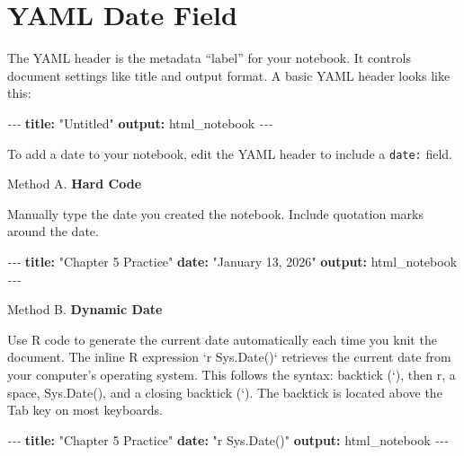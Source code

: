 \documentclass[
  12pt,
]{scrreprt}
\newenvironment{Shaded}{\begin{snugshade}}{\end{snugshade}}
\newcommand{\AttributeTok}[1]{\textcolor[rgb]{0.13,0.29,0.53}{#1}}
\newcommand{\FunctionTok}[1]{\textcolor[rgb]{0.13,0.29,0.53}{\textbf{#1}}}
\newcommand{\KeywordTok}[1]{\textcolor[rgb]{0.13,0.29,0.53}{\textbf{#1}}}
\newcommand{\PreprocessorTok}[1]{\textcolor[rgb]{0.56,0.35,0.01}{\textit{#1}}}
\newcommand{\StringTok}[1]{\textcolor[rgb]{0.31,0.60,0.02}{#1}}
\begin{document}
\section{YAML Date Field}\label{yaml-date-field}

The YAML header is the metadata ``label'' for your notebook. It controls
document settings like title and output format. A basic YAML header
looks like this:

\begin{Shaded}
\begin{Highlighting}[]
\PreprocessorTok{{-}{-}{-}}
\FunctionTok{title}\KeywordTok{:}\AttributeTok{ }\StringTok{"Untitled"}
\FunctionTok{output}\KeywordTok{:}\AttributeTok{ html\_notebook}
\PreprocessorTok{{-}{-}{-}}
\end{Highlighting}
\end{Shaded}

To add a date to your notebook, edit the YAML header to include a
\texttt{date:} field.

Method A. \textbf{Hard Code}

Manually type the date you created the notebook. Include quotation marks
around the date.

\begin{Shaded}
\begin{Highlighting}[]
\PreprocessorTok{{-}{-}{-}}
\FunctionTok{title}\KeywordTok{:}\AttributeTok{ }\StringTok{"Chapter 5 Practice"}
\FunctionTok{date}\KeywordTok{:}\AttributeTok{ }\StringTok{"January 13, 2026"}
\FunctionTok{output}\KeywordTok{:}\AttributeTok{ html\_notebook}
\PreprocessorTok{{-}{-}{-}}
\end{Highlighting}
\end{Shaded}

Method B. \textbf{Dynamic Date}

Use R code to generate the current date automatically each time you knit
the document. The inline R expression `r Sys.Date()` retrieves the
current date from your computer's operating system. This follows the
syntax: backtick (`), then r, a space, Sys.Date(), and a closing
backtick (`). The backtick is located above the Tab key on most
keyboards.

\begin{Shaded}
\begin{Highlighting}[]
\PreprocessorTok{{-}{-}{-}}
\FunctionTok{title}\KeywordTok{:}\AttributeTok{ }\StringTok{"Chapter 5 Practice"}
\FunctionTok{date}\KeywordTok{:}\AttributeTok{ }\StringTok{"\textasciigrave{}r Sys.Date()\textasciigrave{}"}
\FunctionTok{output}\KeywordTok{:}\AttributeTok{ html\_notebook}
\PreprocessorTok{{-}{-}{-}}
\end{Highlighting}
\end{Shaded}
\end{document}
